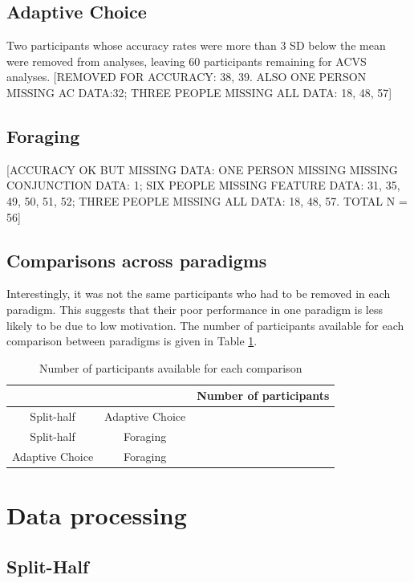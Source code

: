 \documentclass[a4paper, oneside, 11pt, onecolumn]{article}
\begin{document}
\subsection{Adaptive Choice}

Two participants whose accuracy rates were more than 3 SD below the mean were removed from analyses, leaving 60 participants remaining for ACVS analyses. [REMOVED FOR ACCURACY: 38, 39. ALSO ONE PERSON MISSING AC DATA:32; THREE PEOPLE MISSING ALL DATA: 18, 48, 57]

\subsection{Foraging}

[ACCURACY OK BUT MISSING DATA: ONE PERSON MISSING MISSING CONJUNCTION DATA: 1; SIX PEOPLE MISSING FEATURE DATA: 31, 35, 49, 50, 51, 52; THREE PEOPLE MISSING ALL DATA: 18, 48, 57. TOTAL N = 56]

\subsection{Comparisons across paradigms}

Interestingly, it was not the same participants who had to be removed in each paradigm. This suggests that their poor performance in one paradigm is less likely to be due to low motivation. The number of participants available for each comparison between paradigms is given in Table \ref{tab:num_per_paradigm}.

\begin{table}
\centering
\small
\begin{tabular}{cc|c}
 			&					& Number of participants\\
\hline
Split-half 	& Adaptive Choice 	& \\
Split-half 	& Foraging 			& \\
Adaptive Choice & Foraging 		& \\
\end{tabular}
\caption{Number of participants available for each comparison}
\label{tab:num_per_paradigm}
\end{table}

\section{Data processing}

\subsection{Split-Half}
\end{document}
